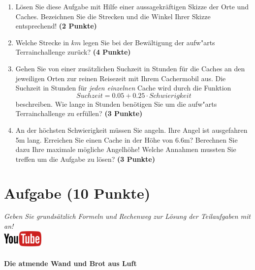 \documentclass[a4paper, 9pt]{scrartcl}\usepackage[]{graphicx}\usepackage[]{xcolor}
\begin{document}
\begin{enumerate}
\item L{\"o}sen Sie diese Aufgabe mit Hilfe einer aussagekr{\"a}ftigen Skizze der
  Orte und Caches. Bezeichnen Sie die Strecken und die Winkel Ihrer Skizze
  entsprechend! \textbf{(2 Punkte)}
\item Welche Strecke in $km$ legen Sie bei der Bew{\"a}ltigung der
  aufw{"a}rts Terrainchallenge zur{\"u}ck? \textbf{(4
    Punkte)}
\item Gehen Sie von einer zus{\"a}tzlichen Suchzeit in Stunden f{\"u}r die
  Caches an den jeweiligen Orten zur reinen Reisezeit mit Ihrem Cachermobil
  aus. Die Suchzeit in Stunden f{\"u}r \textit{jeden einzelnen} Cache wird durch die
  Funktion
  \begin{equation*}
    Suchzeit = 0.05 + 0.25 \cdot Schwierigkeit
  \end{equation*}  
  beschreiben.  Wie lange in Stunden ben{\"o}tigen Sie um die
  aufw{"a}rts Terrainchallenge zu erf{\"u}llen? \textbf{(3 Punkte)}
\item An der h{\"o}chsten Schwierigkeit m{\"u}ssen Sie angeln. Ihre Angel ist
  ausgefahren 5m lang. Erreichen Sie einen Cache in der H{\"o}he
  von 6.6m?  Berechnen Sie dazu Ihre maximale m{\"o}gliche
  Angelh{\"o}he! Welche Annahmen mussten Sie treffen um die Aufgabe zu l{\"o}sen? \textbf{(3 Punkte)} 
\end{enumerate}

 
\clearpage

\section{Aufgabe \hfill (10 Punkte)}

\textit{Geben Sie grunds{\"a}tzlich Formeln und Rechenweg zur L{\"o}sung der
  Teilaufgaben mit an!} \\[1Ex]

\hfill\href{https://youtu.be/4-dSaPMhK9s}{\includegraphics[width =
  2cm]{img/youtube}} %
\hspace{2Ex}

\paragraph{Die atmende Wand und Brot aus Luft}
\end{document}

